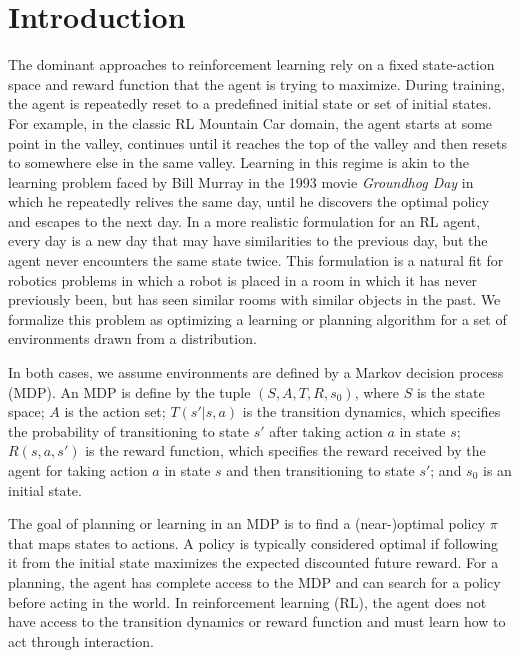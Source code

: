 \section{Introduction}
The dominant approaches to reinforcement learning rely on a fixed
state-action space and reward function that the agent is trying to
maximize.  During training, the agent is repeatedly reset to a
predefined initial state or set of initial states.  For example, in
the classic RL Mountain Car domain, the agent starts at some point in
the valley, continues until it reaches the top of the valley and then
resets to somewhere else in the same valley. Learning in this regime
is akin to the learning problem faced by Bill Murray in the 1993 movie
{\em Groundhog Day} in which he repeatedly relives the same day, until
he discovers the optimal policy and escapes to the next day.  In a
more realistic formulation for an RL agent, every day is a new day
that may have similarities to the previous day, but the agent never
encounters the same state twice.  This formulation is a natural fit
for robotics problems in which a robot is placed in a room in which it
has never previously been, but has seen similar rooms with similar
objects in the past. We formalize this problem as optimizing a learning or planning
algorithm for a set of environments drawn from a distribution.

In both cases, we assume environments are defined by a Markov decision process (MDP). An MDP is define by the tuple $(S, A, T, R, s_0)$, where $S$ is the state space; $A$ is the action set; $T(s' | s, a)$ is the transition dynamics, which specifies the probability of transitioning to state $s'$ after taking action $a$ in state $s$; $R(s, a, s')$ is the reward function, which specifies the reward received by the agent for taking action $a$ in state $s$ and then transitioning to state $s'$; and $s_0$ is an initial state.

The goal of planning or learning in an MDP is to find a (near-)optimal policy $\pi$ that maps states to actions. A policy is typically considered optimal if following it from the initial state maximizes the expected discounted future reward.
For a planning, the agent has complete access to the MDP and can search for a policy before acting in the world. In reinforcement learning (RL), the agent does not have access to the transition dynamics or reward function and must learn how to act through interaction.

